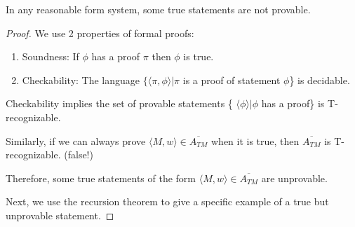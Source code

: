 \begin{theorem}
    In any reasonable form system, some true statements are not provable.
\end{theorem}
\begin{proof}
    We use 2 properties of formal proofs:
    \begin{enumerate}
        \item Soundness: If \(\phi\) has a proof \(\pi\) then \(\phi\) is true.  
        \item Checkability: The language \(\{ \langle \pi, \phi \rangle | \pi \) is a proof of statement \(\phi\)\} is decidable.  
    \end{enumerate}

    Checkability implies the set of provable statements \{ \(\langle \phi \rangle | \phi\) has a proof\} is T-recognizable. 

    Similarly, if we can always prove \(\langle M, w \rangle \in \overline{A_{TM}}\) when it is true, then \(\overline{A_{TM}}\) is T-recognizable. (false!) 

    Therefore, some true statements of the form \(\langle M, w \rangle \in \overline{A_{TM}}\) are unprovable. 

    Next, we use the recursion theorem to give a specific example of a true but unprovable statement.
\end{proof}


